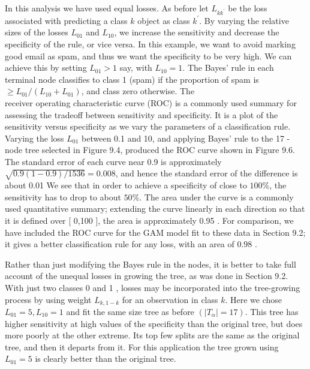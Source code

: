 \documentclass[10pt]{article}
\begin{document}
In this analysis we have used equal losses. As before let $L_{k k^{\prime}}$ be the loss associated with predicting a class $k$ object as class $k^{\prime}$. By varying the relative sizes of the losses $L_{01}$ and $L_{10}$, we increase the sensitivity and decrease the specificity of the rule, or vice versa. In this example, we want to avoid marking good email as spam, and thus we want the specificity to be very high. We can achieve this by setting $L_{01}>1$ say, with $L_{10}=1$. The Bayes' rule in each terminal node classifies to class 1 (spam) if the proportion of spam is $\geq L_{01} /\left(L_{10}+L_{01}\right)$, and class zero otherwise. The\\
receiver operating characteristic curve (ROC) is a commonly used summary for assessing the tradeoff between sensitivity and specificity. It is a plot of the sensitivity versus specificity as we vary the parameters of a classification rule. Varying the loss $L_{01}$ between 0.1 and 10, and applying Bayes' rule to the 17 -node tree selected in Figure 9.4, produced the ROC curve shown in Figure 9.6. The standard error of each curve near 0.9 is approximately $\sqrt{0.9(1-0.9) / 1536}=0.008$, and hence the standard error of the difference is about 0.01 We see that in order to achieve a specificity of close to $100 \%$, the sensitivity has to drop to about $50 \%$. The area under the curve is a commonly used quantitative summary; extending the curve linearly in each direction so that it is defined over [ 0,100 ], the area is approximately 0.95 . For comparison, we have included the ROC curve for the GAM model fit to these data in Section 9.2; it gives a better classification rule for any loss, with an area of 0.98 .

Rather than just modifying the Bayes rule in the nodes, it is better to take full account of the unequal losses in growing the tree, as was done in Section 9.2. With just two classes 0 and 1 , losses may be incorporated into the tree-growing process by using weight $L_{k, 1-k}$ for an observation in class $k$. Here we chose $L_{01}=5, L_{10}=1$ and fit the same size tree as before $\left(\left|T_{\alpha}\right|=17\right)$. This tree has higher sensitivity at high values of the specificity than the original tree, but does more poorly at the other extreme. Its top few splits are the same as the original tree, and then it departs from it. For this application the tree grown using $L_{01}=5$ is clearly better than the original tree.
\end{document}
